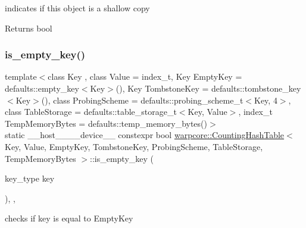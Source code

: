 indicates if this object is a shallow copy 

\begin{DoxyReturn}{Returns}
{\ttfamily bool} 
\end{DoxyReturn}
\mbox{\label{classwarpcore_1_1CountingHashTable_aee558df23486ead4dc8096b939b184df}} 
\subsubsection{\texorpdfstring{is\+\_\+empty\+\_\+key()}{is\_empty\_key()}}
{\footnotesize\ttfamily template$<$class Key , class Value  = index\+\_\+t, Key Empty\+Key = defaults\+::empty\+\_\+key$<$\+Key$>$(), Key Tombstone\+Key = defaults\+::tombstone\+\_\+key$<$\+Key$>$(), class Probing\+Scheme  = defaults\+::probing\+\_\+scheme\+\_\+t$<$\+Key, 4$>$, class Table\+Storage  = defaults\+::table\+\_\+storage\+\_\+t$<$\+Key, Value$>$, index\+\_\+t Temp\+Memory\+Bytes = defaults\+::temp\+\_\+memory\+\_\+bytes()$>$ \\
static \+\_\+\+\_\+host\+\_\+\+\_\+\+\_\+\+\_\+device\+\_\+\+\_\+ constexpr bool \hyperlink{classwarpcore_1_1CountingHashTable}{warpcore\+::\+Counting\+Hash\+Table}$<$ Key, Value, Empty\+Key, Tombstone\+Key, Probing\+Scheme, Table\+Storage, Temp\+Memory\+Bytes $>$\+::is\+\_\+empty\+\_\+key (\begin{DoxyParamCaption}\item[{key\+\_\+type}]{key }\end{DoxyParamCaption})\hspace{0.3cm}{\ttfamily [inline]}, {\ttfamily [static]}, {\ttfamily [noexcept]}}



checks if {\ttfamily key} is equal to {\ttfamily Empty\+Key} 

